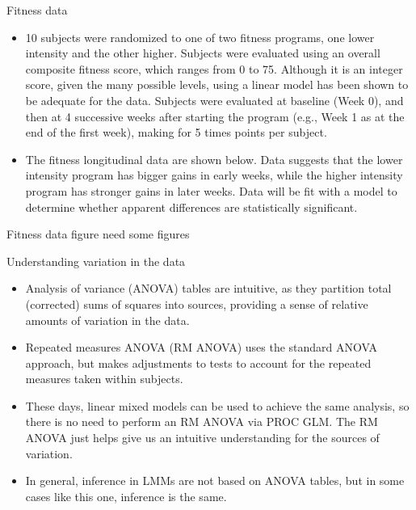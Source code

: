 \documentclass[
  9pt,
  ignorenonframetext,
]{beamer}
\begin{document}
\begin{frame}{Fitness data}
\protect\hypertarget{fitness-data}{}
\begin{itemize}
\item
  10 subjects were randomized to one of two fitness programs, one lower
  intensity and the other higher. Subjects were evaluated using an
  overall composite fitness score, which ranges from 0 to 75. Although
  it is an integer score, given the many possible levels, using a linear
  model has been shown to be adequate for the data. Subjects were
  evaluated at baseline (Week 0), and then at 4 successive weeks after
  starting the program (e.g., Week 1 as at the end of the first week),
  making for 5 times points per subject.
\item
  The fitness longitudinal data are shown below. Data suggests that the
  lower intensity program has bigger gains in early weeks, while the
  higher intensity program has stronger gains in later weeks. Data will
  be fit with a model to determine whether apparent differences are
  statistically significant.
\end{itemize}
\end{frame}

\begin{frame}{Fitness data figure}
\protect\hypertarget{fitness-data-figure}{}
\alert {need some figures}
\end{frame}

\begin{frame}{Understanding variation in the data}
\protect\hypertarget{understanding-variation-in-the-data}{}
\begin{itemize}
\item
  Analysis of variance (ANOVA) tables are intuitive, as they partition
  total (corrected) sums of squares into sources, providing a sense of
  relative amounts of variation in the data.
\item
  Repeated measures ANOVA (RM ANOVA) uses the standard ANOVA approach,
  but makes adjustments to tests to account for the repeated measures
  taken within subjects.
\item
  These days, linear mixed models can be used to achieve the same
  analysis, so there is no need to perform an RM ANOVA via PROC GLM. The
  RM ANOVA just helps give us an intuitive understanding for the sources
  of variation.
\item
  In general, inference in LMMs are not based on ANOVA tables, but in
  some cases like this one, inference is the same.
\end{itemize}
\end{frame}
\end{document}
